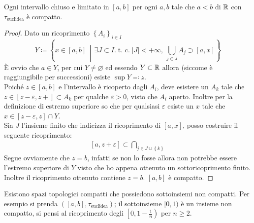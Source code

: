 \begin{theorem}
	Ogni intervallo chiuso e limitato in $\left[a, b\right]$ per ogni $a, b$ tale che $a < b$ di $\mathbb{R}$ con $\tau_{\text{euclidea}}$ è compatto.
\end{theorem} 
\begin{proof}
	Dato un ricoprimento $\left\{A_i\right\}_{i \in I}$ 
	\begin{equation*}
			Y \coloneqq \left\{ x\in \left[a,b\right] \,\middle|\, \exists J \subset I. \; \text{t. c.} \; |J| < +\infty,\ \bigcup_{j \in J} A_j \supset \left[a,x\right] \right\}
	\end{equation*}
	È ovvio che $a \in Y$, per cui $Y \neq \varnothing$ ed essendo $Y \subset \mathbb{R}$ allora (siccome è raggiungibile per successioni) esiste $\sup Y \eqqcolon z$. \\ Poiché $z \in \left[a,b\right]$ e l'intervallo è ricoperto dagli $A_i$, deve esistere un $A_{k}$ tale che $z \in [z-\varepsilon, z+] \subset A_k$ per qualche $\varepsilon > 0$, visto che $A_i$ aperto. Inoltre per la definizione di estremo superiore so che per qualsiasi $\varepsilon$ esiste un $x$ tale che $x \in \left[z-\varepsilon, z\right] \cap Y$. \\ Sia $J$ l'insieme finito che indicizza il ricoprimento di $[a,x]$, posso costruire il seguente ricoprimento:
	\begin{align*}
		\left[a,z+\varepsilon\right] \subset \bigcap_{j \in J\cup \left\{k\right\}}
	\end{align*}
Segue ovviamente che $z = b$, infatti se non lo fosse allora non potrebbe essere l'estremo superiore di $Y$ visto che ho appena ottenuto un sottoricoprimento finito. Inoltre il ricoprimento ottenuto contiene $z = b$. $\left[a,b\right]$ è compatto.
\end{proof}

\begin{remark}
	Esistono spazi topologici compatti che possiedono sottoinsiemi non compatti. Per esempio si prenda $(\left[a, b\right],\tau_{\text{euclidea}})$; il sottoinsieme $[0, 1)$ è un insieme non compatto, si pensi al ricoprimento degli $\left[0,1-\frac{1}{n}\right)$ per $n \geq 2$.
\end{remark} 

